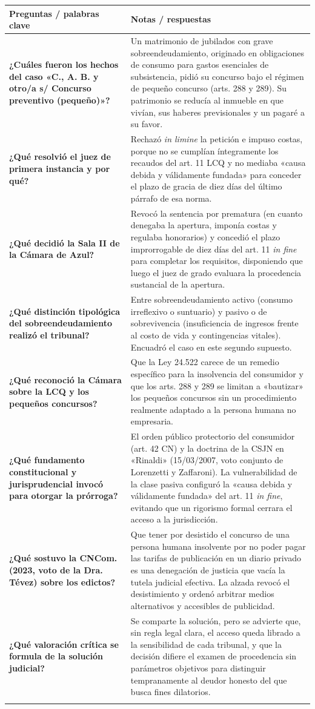 \documentclass[12pt,oneside]{book}
\makeatletter
\newcommand{\cornellrow}[2]{\textbf{#1} & #2 \\ \addlinespace[0.8em]}
\newenvironment{cornell}[1]{%
    \par\medskip
    \noindent{\large\bfseries Cuadro Cornell --- #1}\par\smallskip
    \begin{longtable}{@{}>{\raggedright\arraybackslash}p{0.25\textwidth}>{\raggedright\arraybackslash}p{0.69\textwidth}@{}}
    \toprule
    \textbf{Preguntas / palabras clave} & \textbf{Notas / respuestas} \\
    \midrule
    \endhead
}{%
    \bottomrule
    \end{longtable}
}
\makeatother
\begin{document}
\begin{cornell}{Jurisprudencia}
\cornellrow{¿Cuáles fueron los hechos del caso «C., A. B. y otro/a s/ Concurso preventivo (pequeño)»?}{Un matrimonio de jubilados con grave sobreendeudamiento, originado en obligaciones de consumo para gastos esenciales de subsistencia, pidió su concurso bajo el régimen de pequeño concurso (arts. 288 y 289). Su patrimonio se reducía al inmueble en que vivían, sus haberes previsionales y un pagaré a su favor.}
\cornellrow{¿Qué resolvió el juez de primera instancia y por qué?}{Rechazó \textit{in limine} la petición e impuso costas, porque no se cumplían íntegramente los recaudos del art. 11 LCQ y no mediaba «causa debida y válidamente fundada» para conceder el plazo de gracia de diez días del último párrafo de esa norma.}
\cornellrow{¿Qué decidió la Sala II de la Cámara de Azul?}{Revocó la sentencia por prematura (en cuanto denegaba la apertura, imponía costas y regulaba honorarios) y concedió el plazo improrrogable de diez días del art. 11 \textit{in fine} para completar los requisitos, disponiendo que luego el juez de grado evaluara la procedencia sustancial de la apertura.}
\cornellrow{¿Qué distinción tipológica del sobreendeudamiento realizó el tribunal?}{Entre sobreendeudamiento activo (consumo irreflexivo o suntuario) y pasivo o de sobrevivencia (insuficiencia de ingresos frente al costo de vida y contingencias vitales). Encuadró el caso en este segundo supuesto.}
\cornellrow{¿Qué reconoció la Cámara sobre la LCQ y los pequeños concursos?}{Que la Ley 24.522 carece de un remedio específico para la insolvencia del consumidor y que los arts. 288 y 289 se limitan a «bautizar» los pequeños concursos sin un procedimiento realmente adaptado a la persona humana no empresaria.}
\cornellrow{¿Qué fundamento constitucional y jurisprudencial invocó para otorgar la prórroga?}{El orden público protectorio del consumidor (art. 42 CN) y la doctrina de la CSJN en «Rinaldi» (15/03/2007, voto conjunto de Lorenzetti y Zaffaroni). La vulnerabilidad de la clase pasiva configuró la «causa debida y válidamente fundada» del art. 11 \textit{in fine}, evitando que un rigorismo formal cerrara el acceso a la jurisdicción.}
\cornellrow{¿Qué sostuvo la CNCom. (2023, voto de la Dra. Tévez) sobre los edictos?}{Que tener por desistido el concurso de una persona humana insolvente por no poder pagar las tarifas de publicación en un diario privado es una denegación de justicia que vacía la tutela judicial efectiva. La alzada revocó el desistimiento y ordenó arbitrar medios alternativos y accesibles de publicidad.}
\cornellrow{¿Qué valoración crítica se formula de la solución judicial?}{Se comparte la solución, pero se advierte que, sin regla legal clara, el acceso queda librado a la sensibilidad de cada tribunal, y que la decisión difiere el examen de procedencia sin parámetros objetivos para distinguir tempranamente al deudor honesto del que busca fines dilatorios.}

\end{cornell}
\end{document}
